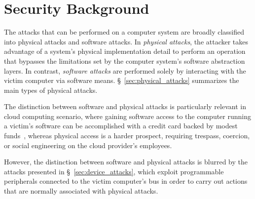 \section{Security Background}
\label{sec:security_background}

The attacks that can be performed on a computer system are broadly classified
into physical attacks and software attacks. In \textit{physical attacks}, the
attacker takes advantage of a system's physical implementation detail to
perform an operation that bypasses the limitations set by the computer
system's software abstraction layers. In contrast, \textit{software attacks}
are performed solely by interacting with the victim computer via software
means. \S~\ref{sec:physical_attacks} summarizes the main types of physical
attacks.

The distinction between software and physical attacks is particularly relevant
in cloud computing scenario, where gaining software access to the computer
running a victim's software can be accomplished with a credit card backed by
modest funds~\cite{ristenpart2009colocation}, whereas physical access is a
harder prospect, requiring trespass, coercion, or social engineering on the
cloud provider's employees.

However, the distinction between software and physical attacks is blurred by
the attacks presented in \S~\ref{sec:device_attacks}, which exploit
programmable peripherals connected to the victim computer's bus in order to
carry out actions that are normally associated with physical attacks.





%


